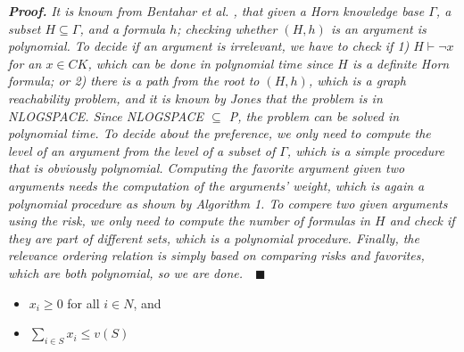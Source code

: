 \noindent\emph{\textbf{Proof.}} \emph{It is known from Bentahar et al. \cite{BentaharIEEEIS2007}, that given a Horn knowledge base
$\Gamma$, a subset $H \subseteq \Gamma$, and a formula $h$; checking whether $(H, h)$ is an argument is polynomial. To decide
if an argument is irrelevant, we have to check if 1) $H \vdash \neg x$ for an $x \in CK$, which can be done in polynomial time
since $H$ is a definite Horn formula; or 2) there is a path from the root to $(H, h)$, which is a graph reachability problem, and
it is known by Jones \cite{Jones} that the problem is in NLOGSPACE. Since NLOGSPACE $\subseteq$ P, the problem can be
solved in polynomial time. To decide about the preference, we only need to compute the level of an argument from the level of a
subset of $\Gamma$, which is  a simple procedure that is obviously polynomial. Computing the favorite argument given two arguments
needs the computation of the arguments' weight, which is again a polynomial procedure as shown by Algorithm 1. To compere two given
arguments using the risk, we only need to compute the number of formulas in $H$ and check if they are part of different sets,
which is a polynomial procedure. Finally, the relevance ordering relation is simply based on comparing risks and favorites, which
are both polynomial, so we are done.}~~$\blacksquare$


        \begin{itemize}
            \item $x_i \geq 0$ for all $i \in N$, and
            \item $\sum_{i \in S} x_i \leq v(S)$
        \end{itemize}









